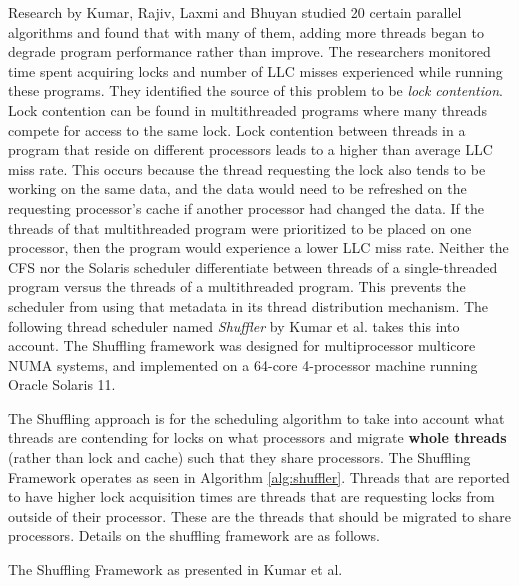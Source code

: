 \documentclass{sig-alternate}
\begin{document}
Research by Kumar, Rajiv, Laxmi and Bhuyan studied 20 certain parallel algorithms and found that with many of them, adding more threads began to degrade program performance rather than improve. The researchers monitored time spent acquiring locks and number of LLC misses experienced while running these programs. They identified the source of this problem to be \emph{lock contention}. Lock contention can be found in multithreaded programs where many threads compete for access to the same lock. Lock contention between threads in a program that reside on different processors leads to a higher than average LLC miss rate. This occurs because the thread requesting the lock also tends to be working on the same data, and the data would need to be refreshed on the requesting processor's cache if another processor had changed the data. If the threads of that multithreaded program were prioritized to be placed on one processor, then the program would experience a lower LLC miss rate. Neither the CFS nor the Solaris scheduler differentiate between threads of a single-threaded program versus the threads of a multithreaded program. This prevents the scheduler from using that metadata in its thread distribution mechanism. The following thread scheduler named \emph{Shuffler} by Kumar et al. takes this into account. The Shuffling framework was designed for multiprocessor multicore NUMA systems, and implemented on a 64-core 4-processor machine running Oracle Solaris 11.~\cite{KumarEtal:2014}

The Shuffling approach is for the scheduling algorithm to take into account what threads are contending for locks on what processors and migrate \textbf{whole threads} (rather than lock and cache) such that they share processors. The Shuffling Framework operates as seen in Algorithm \ref{alg:shuffler}. Threads that are reported to have higher lock acquisition times are threads that are requesting locks from outside of their processor. These are the threads that should be migrated to share processors. Details on the shuffling framework are as follows.~\cite{KumarEtal:2014}

\begin{algorithm}


	\caption{The Shuffling Framework
	as presented in Kumar et al.~\cite{KumarEtal:2014}}\label{alg:shuffler}\label{alg:shuffler}
\end{algorithm}
\end{document}
